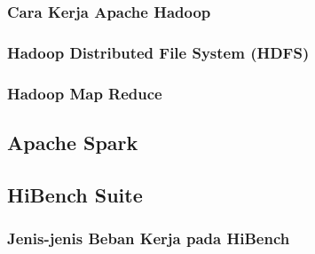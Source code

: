 \subsubsection{Cara Kerja Apache Hadoop}
\blindtext
\subsubsection{Hadoop Distributed File System (HDFS)}
\blindtext
\subsubsection{Hadoop Map Reduce}
\blindtext
\subsection{Apache Spark}
\blindtext
\subsection{HiBench Suite}
\blindtext
\subsubsection{Jenis-jenis Beban Kerja pada HiBench}
